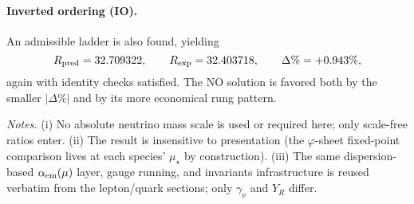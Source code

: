 \documentclass[12pt]{article}
\begin{document}
\paragraph{Inverted ordering (IO).} An admissible ladder is also found, yielding
\[
R_{\rm pred}=32.709322,\qquad R_{\rm exp}=32.403718,\qquad \Delta\%=+0.943\%,
\]
again with identity checks satisfied. The NO solution is favored both by the smaller $|\Delta\%|$ and by its more economical rung pattern.

\medskip
\noindent\emph{Notes.} (i) No absolute neutrino mass scale is used or required here; only scale-free ratios enter. (ii) The result is insensitive to presentation (the $\varphi$-sheet fixed-point comparison lives at each species’ $\mu_\star$ by construction). (iii) The same dispersion-based $\alpha_{\rm em}(\mu)$ layer, gauge running, and invariants infrastructure is reused verbatim from the lepton/quark sections; only $\gamma_\nu$ and $Y_R$ differ.
\end{document}
